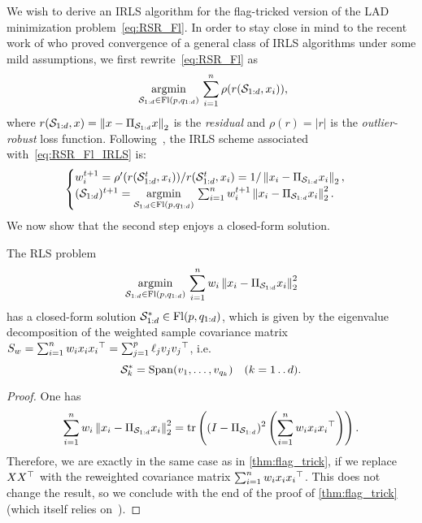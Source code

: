 We wish to derive an IRLS algorithm for the flag-tricked version of the LAD minimization problem~\eqref{eq:RSR_Fl}.
In order to stay close in mind to the recent work of \citet{peng_convergence_2023} who proved convergence of a general class of IRLS algorithms under some mild assumptions, we first rewrite~\eqref{eq:RSR_Fl} as
\begin{equation}~\label{eq:RSR_Fl_IRLS}
    \underset{\mathcal{S}_{1:d} \in\operatorname{Fl}(p, q_{1:d})}{\operatorname{argmin}} \, \sum_{i=1}^n \rho(r(\mathcal{S}_{1:d}, x_i)),
\end{equation}
where $r(\mathcal{S}_{1:d}, x) = \left\lVert x - \Pi_{\mathcal{S}_{1:d}} x\right\rVert_2$ is the \textit{residual} and $\rho(r) = |r|$ is the \textit{outlier-robust} loss function.
Following~\citet{peng_convergence_2023}, the IRLS scheme associated with~\eqref{eq:RSR_Fl_IRLS} is:
\begin{equation}
\begin{cases}
w_i^{t+1} = \rho'(r(\mathcal{S}_{1:d}^t, x_i)) /  r(\mathcal{S}_{1:d}^t, x_i) = 1 / \left\lVert x_i - \Pi_{\mathcal{S}_{1:d}} x_i\right\rVert_2,\\
(\mathcal{S}_{1:d})^{t+1} = \underset{\mathcal{S}_{1:d} \in\operatorname{Fl}(p, q_{1:d})}{\operatorname{argmin}} \, \sum_{i=1}^n w_i^{t+1} \left\lVert x_i - \Pi_{\mathcal{S}_{1:d}} x_i\right\rVert_2^2.
\end{cases}
\end{equation}
We now show that the second step enjoys a closed-form solution.
\begin{theorem}\label{thm:IRLS_FMF}
The RLS problem
\begin{equation}
    \underset{\mathcal{S}_{1:d} \in\operatorname{Fl}(p, q_{1:d})}{\operatorname{argmin}} \, \sum_{i=1}^n w_i \left\lVert x_i - \Pi_{\mathcal{S}_{1:d}} x_i\right\rVert_2^2
\end{equation}
has a closed-form solution $\mathcal{S}_{1:d}^* \in\operatorname{Fl}(p, q_{1:d})$, which is given by the eigenvalue decomposition of the weighted sample covariance matrix $S_w = \sum_{i=1}^n w_i x_i {x_i}^\top = \sum_{j=1}^p \ell_j v_j {v_j}^\top$, i.e.
\begin{equation}
    \mathcal{S}_k^* = \operatorname{Span}(v_1, \dots, v_{q_k}) \quad (k=1\mathinner {\ldotp \ldotp} d).
\end{equation}
\end{theorem}
\begin{proof}
One has
\begin{equation}
	\sum_{i=1}^n w_i \left\lVert x_i - \Pi_{\mathcal{S}_{1:d}} x_i\right\rVert_2^2 = \operatorname{tr}\left((I - \Pi_{\mathcal{S}_{1:d}})^2 \left(\sum_{i=1}^n w_i x_i {x_i}^\top\right)\right).
\end{equation}
Therefore, we are exactly in the same case as in \autoref{thm:flag_trick}, if we replace $X X^\top$ with the reweighted covariance matrix $\sum_{i=1}^n w_i x_i {x_i}^\top$. This does not change the result, so we conclude with the end of the proof of \autoref{thm:flag_trick} (which itself relies on~\citet{szwagier_curse_2024}).
\end{proof}
